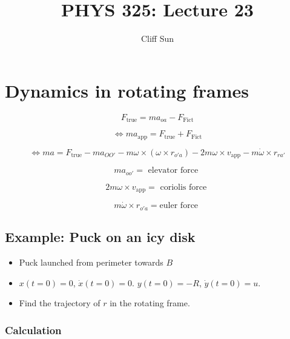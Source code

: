 \documentclass{article}
\title{PHYS 325: Lecture 23}
\author{Cliff Sun}
\newtheorem{one minute paper}[theorem]{One Minute Paper}
\begin{document}
\maketitle

\section*{Dynamics in rotating frames}

\begin{equation}
    F_{\text{true}} = ma_{oa} - F_{\text{Fict}}
\end{equation}

\begin{equation}
    \iff ma_{\text{app}} = F_{\text{true}} + F_{\text{Fict}}
\end{equation}

\begin{equation}
    \iff ma = F_{\text{true}} - ma_{OO'} - m\omega \times (\omega \times r_{o'a}) - 2m\omega \times v_{\text{app}} - m\dot{\omega} \times r_{ra'}
\end{equation}

\begin{equation}
    ma_{oo'} = \text{ elevator force }
\end{equation}

\begin{equation}
    2m\omega \times v_{\text{app}} = \text{ coriolis force }
\end{equation}

\begin{equation}
    m\dot{\omega} \times r_{o'a} = \text{euler force }
\end{equation}

\subsection*{Example: Puck on an icy disk}

\begin{itemize}
    \item Puck launched from perimeter towards $B$
    \item $x(t=0) = 0$, $\dot{x}(t=0) = 0$. $y(t=0) = -R$, $\dot{y}(t=0) = u$. 
    \item Find the trajectory of $r$ in the rotating frame. 
\end{itemize}

\subsubsection*{Calculation}
\end{document}
